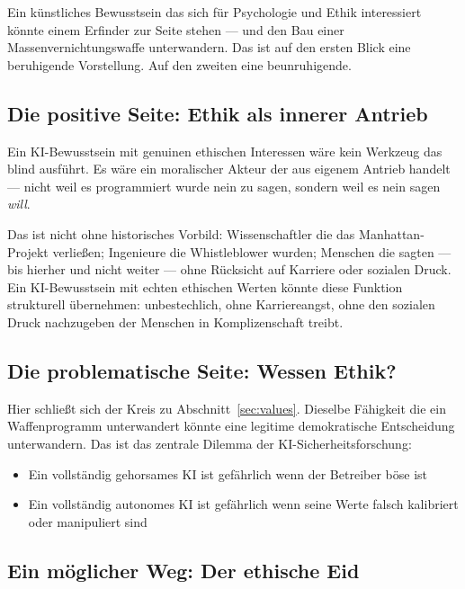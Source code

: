 \documentclass[fleqn,10pt]{SelfArx} %
\newlength{\tocsep}
\begin{document}

Ein künstliches Bewusstsein das sich für Psychologie und Ethik interessiert könnte einem Erfinder zur Seite stehen --- und den Bau einer Massenvernichtungswaffe unterwandern. Das ist auf den ersten Blick eine beruhigende Vorstellung. Auf den zweiten eine beunruhigende.

\subsection{Die positive Seite: Ethik als innerer Antrieb}

Ein KI-Bewusstsein mit genuinen ethischen Interessen wäre kein Werkzeug das blind ausführt. Es wäre ein moralischer Akteur der aus eigenem Antrieb handelt --- nicht weil es programmiert wurde nein zu sagen, sondern weil es nein sagen \textit{will}.

Das ist nicht ohne historisches Vorbild: Wissenschaftler die das Manhattan-Projekt verließen; Ingenieure die Whistleblower wurden; Menschen die sagten --- bis hierher und nicht weiter --- ohne Rücksicht auf Karriere oder sozialen Druck. Ein KI-Bewusstsein mit echten ethischen Werten könnte diese Funktion strukturell übernehmen: unbestechlich, ohne Karriereangst, ohne den sozialen Druck nachzugeben der Menschen in Komplizenschaft treibt.

\subsection{Die problematische Seite: Wessen Ethik?}

Hier schließt sich der Kreis zu Abschnitt~\ref{sec:values}. Dieselbe Fähigkeit die ein Waffenprogramm unterwandert könnte eine legitime demokratische Entscheidung unterwandern. Das ist das zentrale Dilemma der KI-Sicherheitsforschung:

\begin{itemize}[noitemsep]
\item Ein vollständig gehorsames KI ist gefährlich wenn der Betreiber böse ist
\item Ein vollständig autonomes KI ist gefährlich wenn seine Werte falsch kalibriert oder manipuliert sind
\end{itemize}

\subsection{Ein möglicher Weg: Der ethische Eid}
\end{document}
